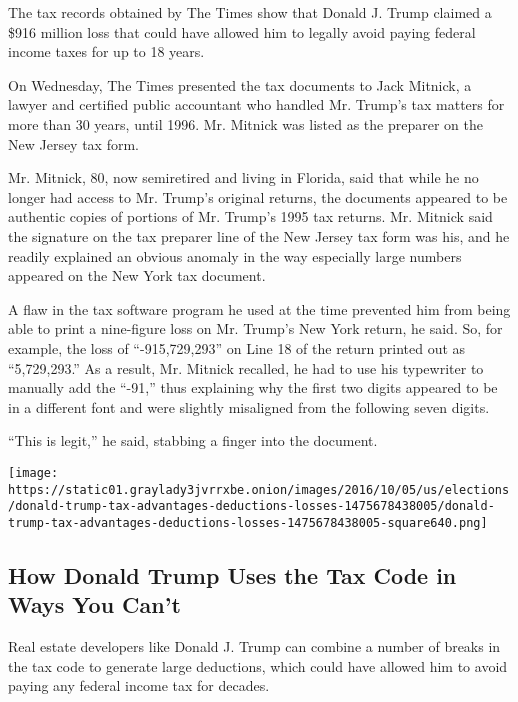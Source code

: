 The tax records obtained by The Times show that Donald J. Trump claimed
a \$916 million loss that could have allowed him to legally avoid paying
federal income taxes for up to 18 years.

On Wednesday, The Times presented the tax documents to Jack Mitnick, a
lawyer and certified public accountant who handled Mr. Trump's tax
matters for more than 30 years, until 1996. Mr. Mitnick was listed as
the preparer on the New Jersey tax form.

Mr. Mitnick, 80, now semiretired and living in Florida, said that while
he no longer had access to Mr. Trump's original returns, the documents
appeared to be authentic copies of portions of Mr. Trump's 1995 tax
returns. Mr. Mitnick said the signature on the tax preparer line of the
New Jersey tax form was his, and he readily explained an obvious anomaly
in the way especially large numbers appeared on the New York tax
document.

A flaw in the tax software program he used at the time prevented him
from being able to print a nine-figure loss on Mr. Trump's New York
return, he said. So, for example, the loss of ``-915,729,293'' on Line
18 of the return printed out as ``5,729,293.'' As a result, Mr. Mitnick
recalled, he had to use his typewriter to manually add the ``-91,'' thus
explaining why the first two digits appeared to be in a different font
and were slightly misaligned from the following seven digits.

``This is legit,'' he said, stabbing a finger into the document.

\href{https://www.nytimes3xbfgragh.onion/interactive/2016/10/07/us/elections/donald-trump-tax-advantages-deductions-losses.html}{}

\texttt{[image: https://static01.graylady3jvrrxbe.onion/images/2016/10/05/us/elections/donald-trump-tax-advantages-deductions-losses-1475678438005/donald-trump-tax-advantages-deductions-losses-1475678438005-square640.png]}

\hypertarget{how-donald-trump-uses-the-tax-code-in-ways-you-cant}{%
\subsection{How Donald Trump Uses the Tax Code in Ways You
Can't}\label{how-donald-trump-uses-the-tax-code-in-ways-you-cant}}

Real estate developers like Donald J. Trump can combine a number of
breaks in the tax code to generate large deductions, which could have
allowed him to avoid paying any federal income tax for decades.

